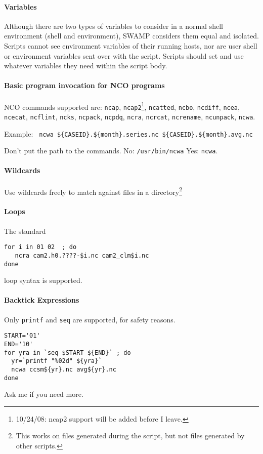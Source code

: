 \documentclass[letterpaper, twocolumn]{article}
\begin{document}
\paragraph{Variables} Although there are two types of variables to
consider in a normal shell environment (shell and environment), SWAMP
considers them equal and isolated.  Scripts cannot see environment
variables of their running hosts, nor are user shell or environment
variables sent over with the script.  Scripts should set and use
whatever variables they need within the script body.  

\paragraph{Basic program invocation for NCO programs}
NCO commands supported are: \texttt{ncap}, \texttt{ncap2}\footnote{
10/24/08: ncap2 support will be added before I leave.},
\texttt{ncatted},  
\texttt{ncbo}, \texttt{ncdiff}, \texttt{ncea}, \texttt{ncecat},
\texttt{ncflint}, \texttt{ncks}, \texttt{ncpack}, \texttt{ncpdq},
\texttt{ncra}, \texttt{ncrcat}, \texttt{ncrename}, \texttt{ncunpack},
\texttt{ncwa}. 

Example: \texttt{ ncwa \$\{CASEID\}.\$\{month\}.series.nc \$\{CASEID\}.\$\{month\}.avg.nc}

Don't put the path to the commands.  No: \texttt{/usr/bin/ncwa} Yes: \texttt{ncwa}.
\paragraph{Wildcards}  Use wildcards freely to match against files in
a directory\footnote{This works on files generated during the script,
  but not files generated by other scripts.}
\paragraph{Loops} The standard 
\begin{verbatim}
for i in 01 02  ; do
   ncra cam2.h0.????-$i.nc cam2_clm$i.nc
done
\end{verbatim}
loop syntax is supported. 
\paragraph{Backtick Expressions}
Only \texttt{printf} and \texttt{seq} are supported, for safety reasons.
\begin{verbatim}
START='01'
END='10'
for yra in `seq $START ${END}` ; do 
  yr=`printf "%02d" ${yra}`
  ncwa ccsm${yr}.nc avg${yr}.nc
done
\end{verbatim}
Ask me if you need more.
\end{document}
